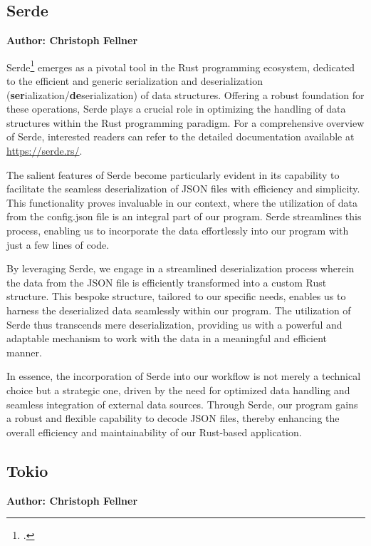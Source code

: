 \subsection{Serde}
\textbf{Author: Christoph Fellner}

Serde\footcite{serde} emerges as a pivotal tool in the Rust programming ecosystem, dedicated to the efficient and generic serialization and deserialization 
(\textbf{ser}ialization/\textbf{de}serialization) of data structures. Offering a robust foundation for these operations, Serde plays a crucial role in optimizing
the handling of data structures within the Rust programming paradigm. For a comprehensive overview of Serde, interested readers can refer to the detailed 
documentation available at \href{https://serde.rs/}{https://serde.rs/}.\newline

The salient features of Serde become particularly evident in its capability to facilitate the seamless deserialization of JSON files with efficiency and 
simplicity. This functionality proves invaluable in our context, where the utilization of data from the config.json file is an integral part of our program. 
Serde streamlines this process, enabling us to incorporate the data effortlessly into our program with just a few lines of code.\newline

By leveraging Serde, we engage in a streamlined deserialization process wherein the data from the JSON file is efficiently transformed into a custom Rust 
structure. This bespoke structure, tailored to our specific needs, enables us to harness the deserialized data seamlessly within our program. The utilization of
Serde thus transcends mere deserialization, providing us with a powerful and adaptable mechanism to work with the data in a meaningful and efficient manner.\newline

In essence, the incorporation of Serde into our workflow is not merely a technical choice but a strategic one, driven by the need for optimized data handling 
and seamless integration of external data sources. Through Serde, our program gains a robust and flexible capability to decode JSON files, thereby enhancing the
overall efficiency and maintainability of our Rust-based application.

\subsection{Tokio}
\textbf{Author: Christoph Fellner}

